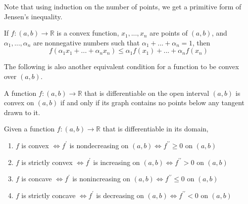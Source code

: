   Note that using induction on the number of points, we get a primitive form of Jensen's inequality. 

  \begin{lemma}
    If $f: (a, b) \longrightarrow \mathbb{R}$ is a convex function, $x_1, ..., x_n$ are points of $(a, b)$, and $\alpha_1, ..., \alpha_n$ are nonnegative numbers such that $\alpha_1 + ... + \alpha_n = 1$, then 
    \begin{equation}
      f(\alpha_1 x_1 + ... + \alpha_n x_n) \leq \alpha_1 f(x_1) + ... + \alpha_n f(x_n)
    \end{equation}
  \end{lemma}

  The following is also another equivalent condition for a function to be convex over $(a, b)$. 

  \begin{theorem}
    A function $f: (a, b) \longrightarrow \mathbb{R}$ that is differentiable on the open interval $(a, b)$ is convex on $(a, b)$ if and only if its graph contains no points below any tangent drawn to it.
  \end{theorem}

  \begin{theorem}
    Given a function $f: (a, b) \longrightarrow \mathbb{R}$ that is differentiable in its domain, 
    \begin{enumerate}
      \item $f$ is convex $\iff f^\prime$ is nondecreasing on $(a, b) \iff f^{\prime\prime} \geq 0$ on $(a, b)$ 
      \item $f$ is strictly convex $\iff f^\prime$ is increasing on $(a, b) \iff f^{\prime\prime} > 0$ on $(a, b)$ 
      \item $f$ is concave $\iff f^\prime$ is nonincreasing on $(a, b) \iff f^{\prime\prime} \leq 0$ on $(a, b)$ 
      \item $f$ is strictly concave $\iff f^\prime$ is decreasing on $(a, b) \iff f^{\prime\prime} < 0$ on $(a, b)$ 
    \end{enumerate}
  \end{theorem}

